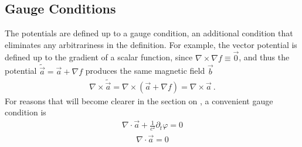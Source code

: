 \documentclass[letterpaper,10pt,english]{jupyterBook}
\begin{document}
\subsection{Gauge Conditions}
\label{\detokenize{ch/potentials:gauge-conditions}}
\sphinxAtStartPar
The potentials are defined up to a gauge condition, an additional condition that eliminates any arbitrariness in the definition. For example, the vector potential is defined up to the gradient of a scalar function, since \(\nabla \times \nabla f \equiv \vec{0}\), and thus the potential \(\tilde{\vec{a}} = \vec{a} + \nabla f\) produces the same magnetic field \(\vec{b}\)
\begin{equation*}
\begin{split}\nabla \times \tilde{\vec{a}} = \nabla \times (\vec{a} + \nabla f) = \nabla \times \vec{a} \ .\end{split}
\end{equation*}
\sphinxAtStartPar
{} For reasons that will become clearer in the section on {\hyperref[\detokenize{ch/waves:classical-electromagnetism-waves}]{}}, a convenient gauge condition is
\begin{equation}\label{equation:ch/potentials:eq:potential:gauge:lorentz}
\begin{split}\nabla \cdot \vec{a} + \frac{1}{c^2} \partial_t \varphi = 0\end{split}
\end{equation}
\sphinxAtStartPar
{}
\begin{equation*}
\begin{split}\nabla \cdot \vec{a} = 0\end{split}
\end{equation*}
\sphinxstepscope
\end{document}
